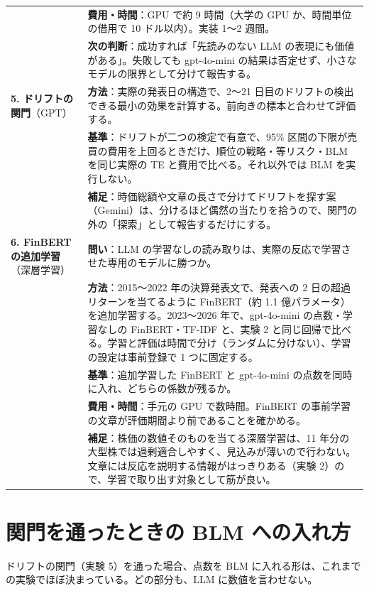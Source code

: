 \documentclass[xelatex,ja=standard,jafont=haranoaji,a4paper,10pt]{bxjsreport}
\begin{document}
\begin{longtable}{p{2.6cm}p{11.6cm}}
& \textbf{費用・時間}：GPU で約 9 時間（大学の GPU か、時間単位の借用で 10 ドル以内）。実装 1〜2 週間。\\
& \textbf{次の判断}：成功すれば「先読みのない LLM の表現にも価値がある」。失敗しても gpt-4o-mini の結果は否定せず、小さなモデルの限界として分けて報告する。\\
\midrule
\textbf{5. ドリフトの関門}（GPT） & \textbf{方法}：実際の発表日の構造で、2〜21 日目のドリフトの検出できる最小の効果を計算する。前向きの標本と合わせて評価する。\\
& \textbf{基準}：ドリフトが二つの検定で有意で、95\% 区間の下限が売買の費用を上回るときだけ、順位の戦略・等リスク・BLM を同じ実際の TE と費用で比べる。それ以外では BLM を実行しない。\\
& \textbf{補足}：時価総額や文章の長さで分けてドリフトを探す案（Gemini）は、分けるほど偶然の当たりを拾うので、関門の外の「探索」として報告するだけにする。\\
\midrule
\textbf{6. FinBERT の追加学習}（深層学習） & \textbf{問い}：LLM の学習なしの読み取りは、実際の反応で学習させた専用のモデルに勝つか。\\
& \textbf{方法}：2015〜2022 年の決算発表文で、発表への 2 日の超過リターンを当てるように FinBERT（約 1.1 億パラメータ）を追加学習する。2023〜2026 年で、gpt-4o-mini の点数・学習なしの FinBERT・TF-IDF と、実験 2 と同じ回帰で比べる。学習と評価は時間で分け（ランダムに分けない）、学習の設定は事前登録で 1 つに固定する。\\
& \textbf{基準}：追加学習した FinBERT と gpt-4o-mini の点数を同時に入れ、どちらの係数が残るか。\\
& \textbf{費用・時間}：手元の GPU で数時間。FinBERT の事前学習の文章が評価期間より前であることを確かめる。\\
& \textbf{補足}：株価の数値そのものを当てる深層学習は、11 年分の大型株では過剰適合しやすく、見込みが薄いので行わない。文章には反応を説明する情報がはっきりある（実験 2）ので、学習で取り出す対象として筋が良い。\\
\end{longtable}

\section{関門を通ったときの BLM への入れ方}

ドリフトの関門（実験 5）を通った場合、点数を BLM に入れる形は、これまでの実験でほぼ決まっている。どの部分も、LLM に数値を言わせない。
\end{document}
